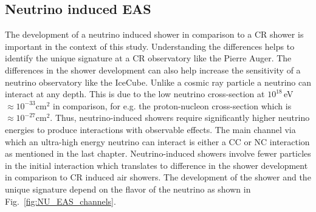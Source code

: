 \subsection{Neutrino induced EAS}
\label{sec:Dev_Nu}
The development of a neutrino induced shower in comparison to a CR shower is important in the context of this study. Understanding the differences helps to identify the unique signature at a CR observatory like the Pierre Auger. The differences in the shower development can also help increase the sensitivity of a neutrino observatory like the IceCube. Unlike a cosmic ray particle a neutrino can interact at any depth. This is due to the low neutrino cross-section at $10^{18}\,$eV $\approx 10^{-33} \mathrm{cm^2}$  in comparison, for e.g. the proton-nucleon cross-section which is $\approx 10^{-27} \mathrm{cm^2}$. Thus, neutrino-induced showers require significantly higher neutrino energies to produce interactions with observable effects. The main channel via which an ultra-high energy neutrino can interact is either a CC or NC interaction as mentioned in the last chapter. Neutrino-induced showers involve fewer particles in the initial interaction which translates to difference in the shower development in comparison to CR induced air showers. The development of the shower and the unique signature depend on the flavor of the neutrino as shown in Fig.~\ref{fig:NU_EAS_channels}.
